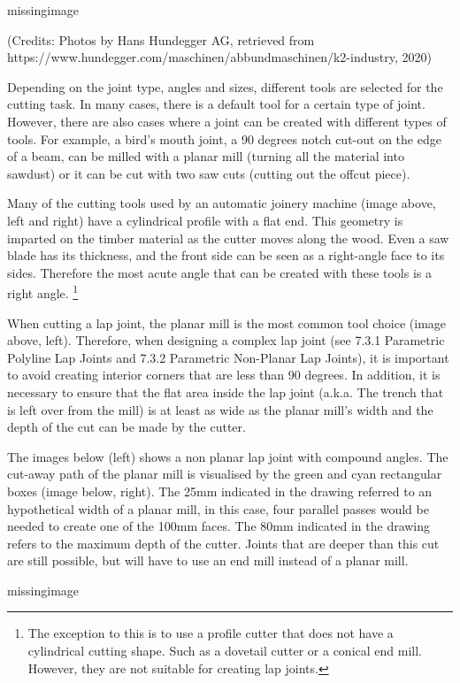 missingimage

(Credits: Photos by Hans Hundegger AG, retrieved from https://www.hundegger.com/maschinen/abbundmaschinen/k2-industry, 2020)

Depending on the joint type, angles and sizes, different tools are selected for the cutting task. In many cases, there is a default tool for a certain type of joint. However, there are also cases where a joint can be created with different types of tools. For example, a bird's mouth joint, a 90 degrees notch cut-out on the edge of a beam, can be milled with a planar mill (turning all the material into sawdust) or it can be cut with two saw cuts (cutting out the offcut piece).

Many of the cutting tools used by an automatic joinery machine (image above, left and right) have a cylindrical profile with a flat end. This geometry is imparted on the timber material as the cutter moves along the wood. Even a saw blade has its thickness, and the front side can be seen as a right-angle face to its sides. Therefore the most acute angle that can be created with these tools is a right angle.
\footnote{The exception to this is to use a profile cutter that does not have a cylindrical cutting shape. Such as a dovetail cutter or a conical end mill. However, they are not suitable for creating lap joints.}

When cutting a lap joint, the planar mill is the most common tool choice (image above, left). Therefore, when designing a complex lap joint (see 7.3.1 Parametric Polyline Lap Joints and 7.3.2 Parametric Non-Planar Lap Joints), it is important to avoid creating interior corners that are less than 90 degrees. In addition, it is necessary to ensure that the flat area inside the lap joint (a.k.a. The trench that is left over from the mill) is at least as wide as the planar mill’s width and the depth of the cut can be made by the cutter.

The images below (left) shows a non planar lap joint with compound angles. The cut-away path of the planar mill is visualised by the green and cyan rectangular boxes (image below, right). The 25mm indicated in the drawing referred to an hypothetical width of a planar mill, in this case, four parallel passes would be needed to create one of the 100mm faces. The 80mm indicated in the drawing refers to the maximum depth of the cutter. Joints that are deeper than this cut are still possible, but will have to use an end mill instead of a planar mill.

missingimage

